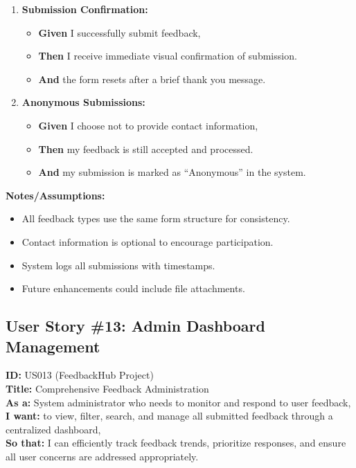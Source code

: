 \documentclass[12pt]{article}
\begin{document}
\begin{enumerate}
    \item \textbf{Submission Confirmation:}
    \begin{itemize}
        \item \textbf{Given} I successfully submit feedback,
        \item \textbf{Then} I receive immediate visual confirmation of submission.
        \item \textbf{And} the form resets after a brief thank you message.
    \end{itemize}

    \item \textbf{Anonymous Submissions:}
    \begin{itemize}
        \item \textbf{Given} I choose not to provide contact information,
        \item \textbf{Then} my feedback is still accepted and processed.
        \item \textbf{And} my submission is marked as ``Anonymous'' in the system.
    \end{itemize}
\end{enumerate}

\vspace{1em}
\textbf{Notes/Assumptions:}
\begin{itemize}
    \item All feedback types use the same form structure for consistency.
    \item Contact information is optional to encourage participation.
    \item System logs all submissions with timestamps.
    \item Future enhancements could include file attachments.
\end{itemize}


\subsection{User Story \#13: Admin Dashboard Management}
\textbf{ID:} US013 (FeedbackHub Project) \\
\textbf{Title:} Comprehensive Feedback Administration \\
\textbf{As a:} System administrator who needs to monitor and respond to user feedback, \\
\textbf{I want:} to view, filter, search, and manage all submitted feedback through a centralized dashboard, \\
\textbf{So that:} I can efficiently track feedback trends, prioritize responses, and ensure all user concerns are addressed appropriately.
\end{document}
